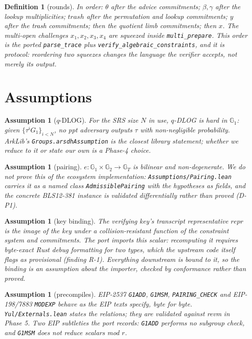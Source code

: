 \documentclass[11pt]{article}
\newtheorem{definition}[theorem]{Definition}
\newtheorem{assumption}[theorem]{Assumption}
\newcommand{\Gone}{\mathbb{G}_1}
\newcommand{\Gtwo}{\mathbb{G}_2}
\newcommand{\GT}{\mathbb{G}_T}
\begin{document}
\begin{definition}[rounds]\label{def:rounds}
In order: $\theta$ after the advice commitments; $\beta,\gamma$ after the lookup
multiplicities; $\mathit{trash}$ after the permutation and lookup commitments; $y$
after the trash commitments; then the quotient limb commitments; then $x$. The
multi-open challenges $x_1,x_2,x_3,x_4$ are squeezed inside
\texttt{multi\_prepare}. This order is the ported \texttt{parse\_trace} plus
\texttt{verify\_algebraic\_constraints}, and it is \emph{protocol}: reordering two
squeezes changes the language the verifier accepts, not merely its output.
\end{definition}

\section{Assumptions}

\begin{assumption}[$q$-DLOG]\label{as:qdlog}
For the SRS size $N$ in use, $q$-DLOG is hard in $\Gone$: given
$\{\tau^i G_1\}_{i<N}$, no ppt adversary outputs $\tau$ with non-negligible
probability. ArkLib's \texttt{Groups.arsdhAssumption} is the closest library
statement; whether we reduce to it or state our own is a Phase-4 choice.
\end{assumption}

\begin{assumption}[pairing]\label{as:pairing}
$e : \Gone \times \Gtwo \to \GT$ is bilinear and non-degenerate. We do not prove
this of the ecosystem implementation: \texttt{Assumptions/Pairing.lean} carries it
as a named class \texttt{AdmissiblePairing} with the hypotheses as fields, and the
concrete BLS12-381 instance is validated differentially rather than proved (D-P1).
\end{assumption}

\begin{assumption}[key binding]\label{as:vk}
The verifying key's transcript representative $\mathit{repr}$ is the image of the
key under a collision-resistant function of the constraint system and commitments.
The port \emph{imports} this scalar: recomputing it requires byte-exact Rust
debug formatting for two types, which the upstream code itself flags as provisional
(finding R-1). Everything downstream is bound to it, so the binding is an assumption
about the importer, checked by conformance rather than proved.
\end{assumption}

\begin{assumption}[precompiles]\label{as:precompiles}
EIP-2537 \texttt{G1ADD}, \texttt{G1MSM}, \texttt{PAIRING\_CHECK} and EIP-198/7883
\texttt{MODEXP} behave as the EIP texts specify, byte for byte.
\texttt{Yul/Externals.lean} states the relations; they are validated against revm in
Phase 5. Two EIP subtleties the port records: \texttt{G1ADD} performs no subgroup
check, and \texttt{G1MSM} does not reduce scalars mod $r$.
\end{assumption}
\end{document}
